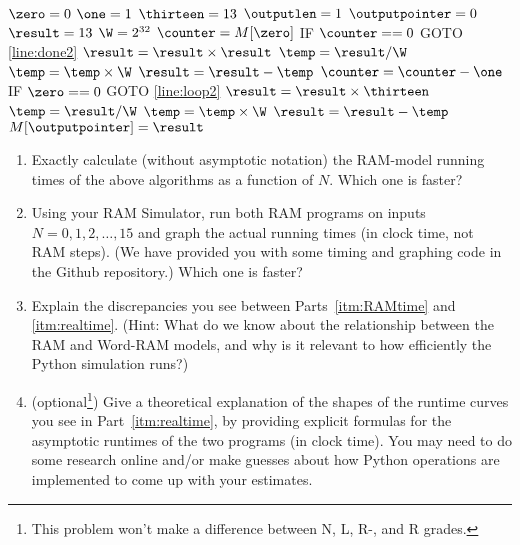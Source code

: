 \documentclass[11pt]{article}
\begin{document}
\begin{enumerate}
\begin{algorithm}[H]
\setcounter{AlgoLine}{-1}
$\zero = 0$\;
$\one = 1$\;
$\thirteen = 13$\;
$\outputlen = 1$\;
$\outputpointer = 0$\;
$\result = 13$\;
$\W = 2^{32}$\;
$\counter = M[\zero]$\;
\Indp
IF $\counter == 0$ GOTO \ref{line:done2}\; \label{line:loop2}
$\result = \result \times \result$\;
$\temp = \result / \W$\;
$\temp = \temp \times \W$\;
$\result = \result - \temp$\;
$\counter = \counter - \one$\;
IF $\zero == 0$ GOTO \ref{line:loop2}\;
\Indm
$\result = \result \times \thirteen$\;
\label{line:done2}
$\temp = \result / \W$\;
$\temp = \temp \times \W$\;
$\result = \result - \temp$\;
$M[\outputpointer]=\result$\; 
\end{algorithm}

\begin{enumerate}
    \item Exactly calculate (without asymptotic notation) the RAM-model running times of the above algorithms as a function of $N$.
    Which one is faster? \label{itm:RAMtime}    
    \item Using your RAM Simulator, run both RAM programs on inputs $N=0,1,2,\ldots,15$ and graph the actual running times (in clock time, not RAM steps).  (We have provided you with some timing and graphing code in the Github repository.) Which one is faster?  \label{itm:realtime}  
    
    \item Explain the discrepancies you see between Parts~\ref{itm:RAMtime} and \ref{itm:realtime}.  (Hint: What do we know about the relationship between the RAM and Word-RAM models, and why is it relevant to how efficiently the Python simulation runs?) 
    
    \item (optional\footnote{This problem won't make a difference between N, L, R-, and R grades.}) Give a theoretical explanation of the shapes of the runtime curves you see in Part~\ref{itm:realtime}, by providing explicit formulas for the asymptotic runtimes of the two programs (in clock time). You may need to do some research online and/or make guesses about how Python operations are implemented to come up with your estimates. 

\end{enumerate}


\end{enumerate}
\end{document}

